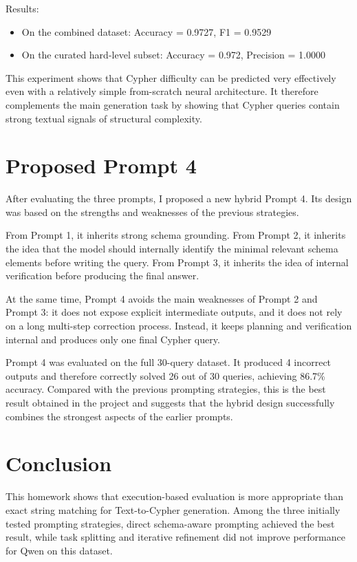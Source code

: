 \documentclass{article}
\begin{document}
Results:
\begin{itemize}
    \item On the combined dataset: Accuracy = 0.9727, F1 = 0.9529
    \item On the curated hard-level subset: Accuracy = 0.972, Precision = 1.0000
\end{itemize}

This experiment shows that Cypher difficulty can be predicted very effectively even with a relatively simple from-scratch neural architecture. It therefore complements the main generation task by showing that Cypher queries contain strong textual signals of structural complexity.

\section{Proposed Prompt 4}

After evaluating the three prompts, I proposed a new hybrid Prompt 4. Its design was based on the strengths and weaknesses of the previous strategies.

From Prompt 1, it inherits strong schema grounding. From Prompt 2, it inherits the idea that the model should internally identify the minimal relevant schema elements before writing the query. From Prompt 3, it inherits the idea of internal verification before producing the final answer.

At the same time, Prompt 4 avoids the main weaknesses of Prompt 2 and Prompt 3: it does not expose explicit intermediate outputs, and it does not rely on a long multi-step correction process. Instead, it keeps planning and verification internal and produces only one final Cypher query.

Prompt 4 was evaluated on the full 30-query dataset. It produced 4 incorrect outputs and therefore correctly solved 26 out of 30 queries, achieving 86.7\% accuracy. Compared with the previous prompting strategies, this is the best result obtained in the project and suggests that the hybrid design successfully combines the strongest aspects of the earlier prompts.

\section{Conclusion}

This homework shows that execution-based evaluation is more appropriate than exact string matching for Text-to-Cypher generation. Among the three initially tested prompting strategies, direct schema-aware prompting achieved the best result, while task splitting and iterative refinement did not improve performance for Qwen on this dataset.
\end{document}
